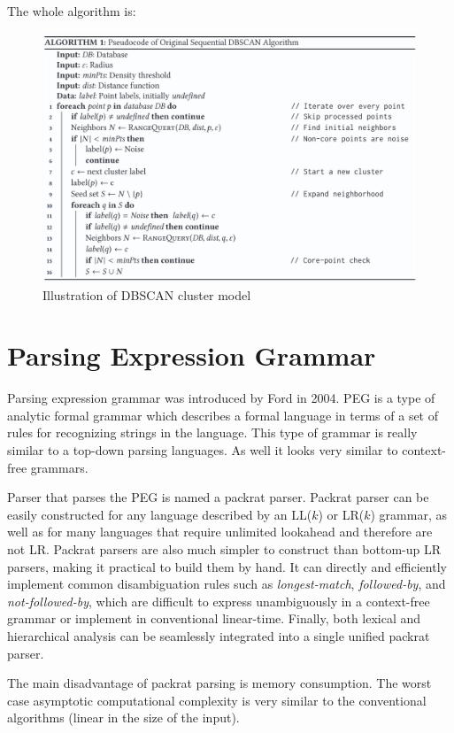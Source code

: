 	The whole algorithm is:
	\nopagebreak
	\begin{figure}[H]
		\centering
		\includegraphics[width=\linewidth]{obrazky-figures/algo_dbscan}
		\caption{Illustration of DBSCAN cluster model}
		\label{dbscan_ilustration}
	\end{figure}



\section{Parsing Expression Grammar}
Parsing expression grammar was introduced by Ford in 2004.
PEG is a type of analytic formal grammar which describes a formal language in terms of a set of rules for recognizing strings in the language.
This type of grammar is really similar to a top-down parsing languages.
As well it looks very similar to context-free grammars.

Parser that parses the PEG is named a packrat parser.
Packrat parser can be easily constructed for any language described by an LL($k$) or LR($k$) grammar, as well as for many languages that require unlimited lookahead and therefore are not LR.
Packrat parsers are also much simpler to construct than bottom-up LR parsers, making it practical to build them by hand.
It can directly and efficiently implement common disambiguation rules such as \textit{longest-match}, \textit{followed-by}, and \textit{not-followed-by}, which are difficult to express unambiguously in a context-free grammar or implement in conventional linear-time.
Finally, both lexical and hierarchical analysis can be seamlessly integrated into a single unified packrat parser.

The main disadvantage of packrat parsing is memory consumption.
The worst case asymptotic computational complexity is very similar to the conventional algorithms (linear in the size of the input).

